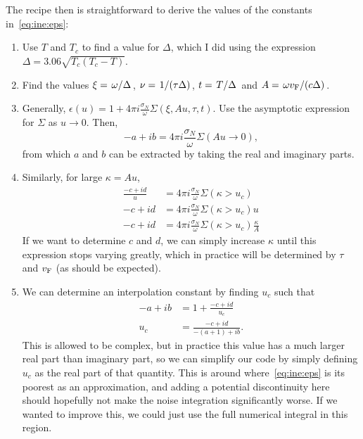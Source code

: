 \documentclass[../main.tex]{subfiles}
\begin{document}
	The recipe then is straightforward to derive the values of the constants in~\eqref{eq:ine:eps}:
	\begin{enumerate}
		\item Use $T$ and $T_c$ to find a value for $\Delta$, which I did using the expression $\Delta = 3.06 \sqrt{T_c(T_c - T)}$.
		\item Find the values $\xi = \flatfrac{\omega}{\Delta}$, $\nu = \flatfrac{1}{(\tau \Delta)}$,  $t = \flatfrac{T}{\Delta}$ and $A = \flatfrac{\omega \vf}{(c \Delta)}$.
		\item Generally, $\epsilon(u) = 1 + 4 \pi i \frac{\sigma_N}{\omega} \Sigma(\xi, A u, \tau, t)$.
			Use the asymptotic expression for $\Sigma$ as $u \rightarrow 0$.
			Then,
			\begin{equation}
				-a + ib = 4 \pi i \frac{\sigma_N}{\omega} \Sigma(A u \rightarrow 0),
			\end{equation}
			from which $a$ and $b$ can be extracted by taking the real and imaginary parts.
		\item Similarly, for large $\kappa = A u$,
			\begin{align}
				\frac{-c + i d}{u} &= 4 \pi i \frac{\sigma_N}{\omega} \Sigma(\kappa > u_c) \\
				- c + i d &= 4 \pi i \frac{\sigma_N}{\omega} \Sigma(\kappa > u_c) u \\
				- c + i d &= 4 \pi i \frac{\sigma_N}{\omega} \Sigma(\kappa > u_c) \frac{\kappa}{A}
			\end{align}
			If we want to determine $c$ and $d$, we can simply increase $\kappa$ until this expression stops varying greatly, which in practice will be determined by $\tau$ and $v_{\mathrm{F}}$ (as should be expected).
		\item We can determine an interpolation constant by finding $u_c$ such that
			\begin{align}
				-a + ib &= 1 + \frac{-c + id}{u_c} \\
				u_c &= \frac{-c + id}{-(a + 1) + ib}.
			\end{align}
			This is allowed to be complex, but in practice this value has a much larger real part than imaginary part, so we can simplify our code by simply defining $u_c$ as the real part of that quantity.
			This is around where~\eqref{eq:ine:eps} is its poorest as an approximation, and adding a potential discontinuity here should hopefully not make the noise integration significantly worse.
			If we wanted to improve this, we could just use the full numerical integral in this region.
	\end{enumerate}
\end{document}

